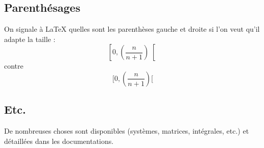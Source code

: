 \documentclass[a4paper, 11pt]{article}
\begin{document}
  \subsection{Parenthésages}

  On signale à \LaTeX{} quelles sont les parenthèses gauche et droite si l'on veut qu'il adapte la taille :
  \[
  \left[
    0,
    \left(
      \frac{n}{n+1}
    \right)
  \right[
  \]
  contre
  \[
  [0,(\frac{n}{n+1})[
  \]

  \subsection{Etc.}

  De nombreuses choses sont disponibles (systèmes, matrices, intégrales, etc.) et détaillées dans les documentations.
\end{document}
